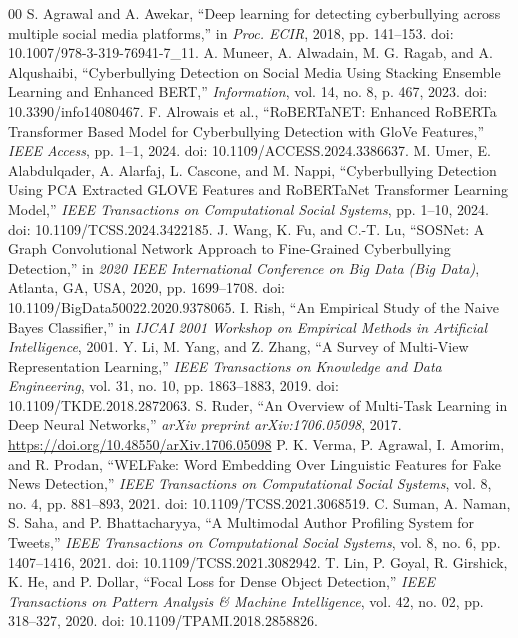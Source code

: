 \begin{thebibliography}{00}
 S. Agrawal and A. Awekar, ``Deep learning for detecting cyberbullying across multiple social media platforms,'' in \textit{Proc. ECIR}, 2018, pp. 141--153. doi: 10.1007/978-3-319-76941-7\_11.
 A. Muneer, A. Alwadain, M. G. Ragab, and A. Alqushaibi, ``Cyberbullying Detection on Social Media Using Stacking Ensemble Learning and Enhanced BERT,'' \textit{Information}, vol. 14, no. 8, p. 467, 2023. doi: 10.3390/info14080467.
 F. Alrowais et al., ``RoBERTaNET: Enhanced RoBERTa Transformer Based Model for Cyberbullying Detection with GloVe Features,'' \textit{IEEE Access}, pp. 1--1, 2024. doi: 10.1109/ACCESS.2024.3386637.
 M. Umer, E. Alabdulqader, A. Alarfaj, L. Cascone, and M. Nappi, ``Cyberbullying Detection Using PCA Extracted GLOVE Features and RoBERTaNet Transformer Learning Model,'' \textit{IEEE Transactions on Computational Social Systems}, pp. 1--10, 2024. doi: 10.1109/TCSS.2024.3422185.
 J. Wang, K. Fu, and C.-T. Lu, ``SOSNet: A Graph Convolutional Network Approach to Fine-Grained Cyberbullying Detection,'' in \textit{2020 IEEE International Conference on Big Data (Big Data)}, Atlanta, GA, USA, 2020, pp. 1699--1708. doi: 10.1109/BigData50022.2020.9378065.
 I. Rish, ``An Empirical Study of the Naive Bayes Classifier,'' in \textit{IJCAI 2001 Workshop on Empirical Methods in Artificial Intelligence}, 2001.
 Y. Li, M. Yang, and Z. Zhang, ``A Survey of Multi-View Representation Learning,'' \textit{IEEE Transactions on Knowledge and Data Engineering}, vol. 31, no. 10, pp. 1863--1883, 2019. doi: 10.1109/TKDE.2018.2872063.
 S. Ruder, ``An Overview of Multi-Task Learning in Deep Neural Networks,'' \textit{arXiv preprint arXiv:1706.05098}, 2017. \url{https://doi.org/10.48550/arXiv.1706.05098}
 P. K. Verma, P. Agrawal, I. Amorim, and R. Prodan, ``WELFake: Word Embedding Over Linguistic Features for Fake News Detection,'' \textit{IEEE Transactions on Computational Social Systems}, vol. 8, no. 4, pp. 881--893, 2021. doi: 10.1109/TCSS.2021.3068519.
 C. Suman, A. Naman, S. Saha, and P. Bhattacharyya, ``A Multimodal Author Profiling System for Tweets,'' \textit{IEEE Transactions on Computational Social Systems}, vol. 8, no. 6, pp. 1407--1416, 2021. doi: 10.1109/TCSS.2021.3082942.
 T. Lin, P. Goyal, R. Girshick, K. He, and P. Dollar, ``Focal Loss for Dense Object Detection,'' \textit{IEEE Transactions on Pattern Analysis \& Machine Intelligence}, vol. 42, no. 02, pp. 318--327, 2020. doi: 10.1109/TPAMI.2018.2858826.

\end{thebibliography}
